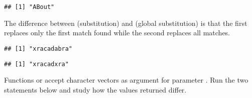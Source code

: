 \documentclass[krantz2]{krantz}\usepackage{knitr}
\begin{document}
\begin{knitrout}\footnotesize
{}\color{fgcolor}\begin{kframe}
\begin{alltt}
\hlstd{(} \hlstd{=} \hlstd{,}  \hlstd{=} \hlstd{,}  \hlstd{=} \hlstd{)}
\end{alltt}
\begin{verbatim}
## [1] "ABout"
\end{verbatim}
\end{kframe}
\end{knitrout}

The difference between  (substitution) and  (global substitution) is that the first replaces only the first match found while the second replaces all matches.

\begin{knitrout}\footnotesize
{}\color{fgcolor}\begin{kframe}
\begin{alltt}
\hlstd{(} \hlstd{=} \hlstd{,}  \hlstd{=} \hlstd{,}  \hlstd{=} \hlstd{)}
\end{alltt}
\begin{verbatim}
## [1] "xracadabra"
\end{verbatim}
\begin{alltt}
\hlstd{(} \hlstd{=} \hlstd{,}  \hlstd{=} \hlstd{,}  \hlstd{=} \hlstd{)}
\end{alltt}
\begin{verbatim}
## [1] "xracadxra"
\end{verbatim}
\end{kframe}
\end{knitrout}

\begin{playground}
Functions  or  accept character vectors as argument for parameter . Run the two statements below and study how the values returned differ.

\begin{knitrout}\footnotesize
{}\color{fgcolor}\begin{kframe}
\begin{alltt}
\hlstd{(} \hlstd{=} \hlstd{,}  \hlstd{=} \hlstd{,}  \hlstd{=} \hlstd{(}\hlstd{,} \hlstd{))}
\hlstd{(} \hlstd{=} \hlstd{,}  \hlstd{=} \hlstd{,}  \hlstd{=} \hlstd{(}\hlstd{,} \hlstd{))}
\end{alltt}
\end{kframe}
\end{knitrout}

\end{playground}
\end{document}

